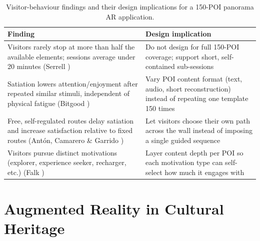 \begin{table}[h]
\centering
\caption{Visitor-behaviour findings and their design implications for a
150-POI panorama AR application.}
\label{tab:visitor-behaviour-design}
\small
\begin{tabular}{p{7cm}p{7cm}}
\toprule
\textbf{Finding} & \textbf{Design implication} \\
\midrule
Visitors rarely stop at more than half the available elements; sessions
average under 20 minutes (Serrell \cite{serrell1997}) &
Do not design for full 150-POI coverage; support short, self-contained
sub-sessions \\
\addlinespace
Satiation lowers attention/enjoyment after repeated similar stimuli,
independent of physical fatigue (Bitgood \cite{bitgood2009a,bitgood2009b}) &
Vary POI content format (text, audio, short reconstruction) instead of
repeating one template 150 times \\
\addlinespace
Free, self-regulated routes delay satiation and increase satisfaction
relative to fixed routes (Antón, Camarero \& Garrido \cite{anton2018}) &
Let visitors choose their own path across the wall instead of imposing a
single guided sequence \\
\addlinespace
Visitors pursue distinct motivations (explorer, experience seeker,
recharger, etc.) (Falk \cite{falk2009}) &
Layer content depth per POI so each motivation type can self-select how
much it engages with \\
\bottomrule
\end{tabular}
\end{table}

























\section{Augmented Reality in Cultural Heritage}
\label{sec:rw-ar-ch}

